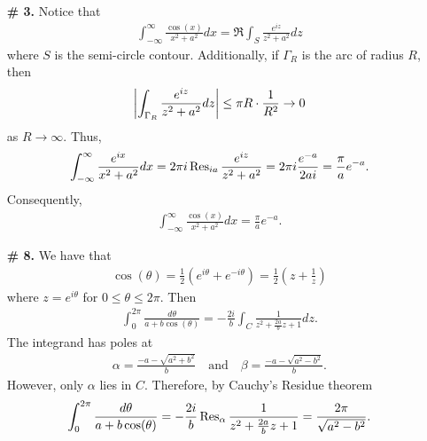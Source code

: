 \documentclass[a4paper,12pt]{article} %
\theoremstyle{plain}
\theoremstyle{definition}
\begin{document}
\begin{enumerate}
\item[\textbf{\# 3.}]
  Notice that
  \begin{align*}
    \int_{-\infty}^{\infty} \frac{\cos(x)}{x^2 + a^2} dx = \Re\int_S \frac{e^{iz}}{z^{2} + a^2} dz 
  \end{align*}
  where $S$ is the semi-circle contour.  Additionally, if $\Gamma_R$ is the arc of radius $R$, then
   \begin{align*}
   \abs{\int_{\Gamma_R} \frac{e^{iz}}{z^2 + a^2} dz} \le \pi R \cdot \frac{1}{R^2} \to 0
  \end{align*}
  as $R \to \infty$.  Thus,
  \begin{align*}
    \int_{-\infty}^{\infty} \frac{e^{ix}}{x^2 + a^2} dx = 2 \pi i \Res_{ia} \frac{e^{iz}}{z^2 + a^2} = 2 \pi i \frac{e^{-a}}{2ai} = \frac{\pi}{a} e^{-a}.
  \end{align*}
  Consequently,
  \begin{align*}
    \int_{-\infty}^{\infty} \frac{\cos(x)}{x^2+a^2} dx = \frac{\pi}{a} e^{-a}.
  \end{align*}
\item[\textbf{\# 8.}]
  We have that 
  \begin{align*}
  \cos(\theta) = \frac{1}{2}\left(e^{i\theta} + e^{-i\theta} \right) = \frac{1}{2}\left( z + \frac{1}{z} \right)
  \end{align*}
  where $z = e^{i\theta}$ for $0 \le  \theta \le 2\pi$.  Then
  \begin{align*}
    \int_{0}^{2 \pi } \frac{d\theta}{a + b \cos(\theta)} = -\frac{2i}{b} \int_{C} \frac{1}{z^2 +\frac{2a}{b}z + 1} dz.
  \end{align*}
  The integrand has poles at 
  \begin{align*}
    \alpha = \frac{-a -\sqrt{a^2 + b^2}}{b} \quad \text{and} \quad \beta = \frac{-a -\sqrt{a^2-b^2}  }{b}.
  \end{align*}
However, only $\alpha$ lies in $C$.  Therefore, by Cauchy's Residue theorem
\begin{align*}
  \int_{0}^{2\pi} \frac{d \theta}{a + b \cos(\theta)} = -\frac{2i}{b} \Res_{\alpha} \frac{1}{z^2 + \frac{2a}{b}z + 1} = \frac{2\pi}{\sqrt{a^2-b^2} }.
\end{align*}
  

\end{enumerate}
\end{document}
